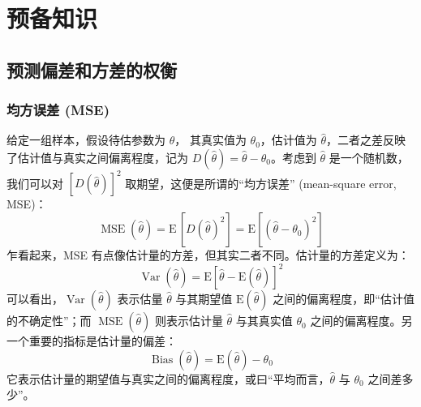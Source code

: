 \section{预备知识}

\subsection{预测偏差和方差的权衡}


\subsubsection{均方误差 (MSE)}
给定一组样本，假设待估参数为 $\theta$，
其真实值为 $\theta_0$，估计值为 $\hat{\theta}$，二者之差反映了估计值与真实之间偏离程度，记为  $D(\hat{\theta}) =\hat{\theta}-\theta_0$。考虑到 $\hat{\theta}$ 是一个随机数，我们可以对 $[D(\hat{\theta})]^2$ 取期望，这便是所谓的“均方误差” (mean-square error, MSE)：
$$
\operatorname{MSE}(\hat{\theta})=\mathrm{E}\,[D(\hat{\theta})^2] = \mathrm{E}\left[(\hat{\theta}-\theta_0)^2\right]
$$
乍看起来，MSE 有点像估计量的方差，但其实二者不同。估计量的方差定义为：
$$
\operatorname{Var}(\hat{\theta}) = \mathrm{E}\left[\hat{\theta}-\mathrm{E}(\hat{\theta})\right]^{2}
$$
可以看出，$\operatorname{Var}(\hat{\theta})$ 表示估量 $\hat{\theta}$ 与其期望值 $\mathrm{E}(\hat{\theta})$ 之间的偏离程度，即“估计值的不确定性”；而 $\operatorname{MSE}(\hat{\theta})$ 则表示估计量 $\hat{\theta}$ 与其真实值 $\theta_0$ 之间的偏离程度。另一个重要的指标是估计量的偏差：
$$ \operatorname{Bias}(\hat{\theta})=\mathrm{E}(\hat{\theta})-\theta_{0}
$$
它表示估计量的期望值与真实之间的偏离程度，或曰“平均而言，$\hat{\theta}$ 与 $\theta_0$ 之间差多少”。


